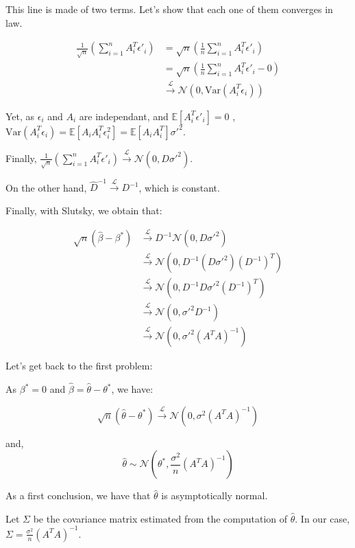 This line is made of two terms. Let's show that each one of them converges in law. 

\begin{align*}
    \frac{1}{\sqrt{n}} \left( \sum_{i=1}^{n}  A_i^T \epsilon'_i \right) &= \sqrt{n} \left( \frac{1}{n} \sum_{i=1}^{n}  A_i^T \epsilon'_i \right) \\
    &= \sqrt{n} \left( \frac{1}{n} \sum_{i=1}^{n}  A_i^T \epsilon'_i - 0 \right) \\
    &\xrightarrow{\mathcal{L}} \mathcal{N}(0, \text{Var}(A_i^T \epsilon_i) )
\end{align*}

Yet, as $\epsilon_i $ and $  A_i $ are independant, and $\mathbb{E} [ A_i^T \epsilon'_i] = 0 $ , $\text{Var}(A_i^T \epsilon_i) = \mathbb{E}[A_i A_i ^T \epsilon_i ^2 ] = \mathbb{E} [ A_i A_i ^T ] \sigma'^2$. 

Finally, $\frac{1}{\sqrt{n}} \left( \sum_{i=1}^{n}  A_i^T \epsilon'_i \right) \xrightarrow{\mathcal{L}} \mathcal{N}(0, D \sigma'^{2})$. 

On the other hand, $\hat{D}^{-1} \xrightarrow{\mathcal{L}} D^{-1} $, which is constant.

Finally, with Slutsky, we obtain that: 

\begin{align*}
    \sqrt{n} (\hat{\beta} - \beta^*) &\xrightarrow{\mathcal{L}} D^{-1}\mathcal{N}(0, D \sigma'^2) \\
    &\xrightarrow{\mathcal{L}} \mathcal{N}(0, D^{-1} (D \sigma'^2) (D^{-1})^T) \\
    &\xrightarrow{\mathcal{L}} \mathcal{N}(0, D^{-1} D \sigma'^2 (D^{-1})^{T}) \\
    &\xrightarrow{\mathcal{L}} \mathcal{N}(0, \sigma'^2 D^{-1}) \\
    &\xrightarrow{\mathcal{L}} \mathcal{N}(0, \sigma'^2 (A^T A)^{-1})
\end{align*}


Let's get back to the first problem: 

As $\beta ^* = 0 $ and $\hat{\beta} = \hat{\theta} - \theta ^* $, we have: 

\[
\sqrt{n} (\hat{\theta} - \theta^*) \xrightarrow{\mathcal{L}} \mathcal{N}(0, \sigma^2 (A^T A)^{-1})
\]

and, 
\[
\hat{\theta} \sim \mathcal{N}(\theta^*, \frac{\sigma^2}{n} (A^T A)^{-1})
\]

As a first conclusion, we have that $\hat{\theta}$ is asymptotically normal.

Let $\Sigma$ be the covariance matrix estimated from the computation of $\hat{\theta}$. In our case, $\Sigma = \frac{\sigma^2}{n} (A^T A)^{-1}$. 

